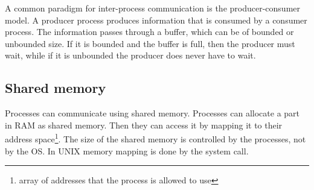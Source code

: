 A common paradigm for inter-process communication is the producer-consumer model. A producer process produces information that is consumed by a consumer process. The information passes through a buffer, which can be of bounded or unbounded size. If it is bounded and the buffer is full, then the producer must wait, while if it is unbounded the producer does never have to wait.


\subsection{Shared memory}
Processes can communicate using shared memory. Processes can allocate a part in RAM as shared memory. Then they can access it by mapping it to their address space\footnote{array of addresses that the process is allowed to use}. The size of the shared memory is controlled by the processes, not by the OS. In UNIX memory mapping is done by the  system call.


